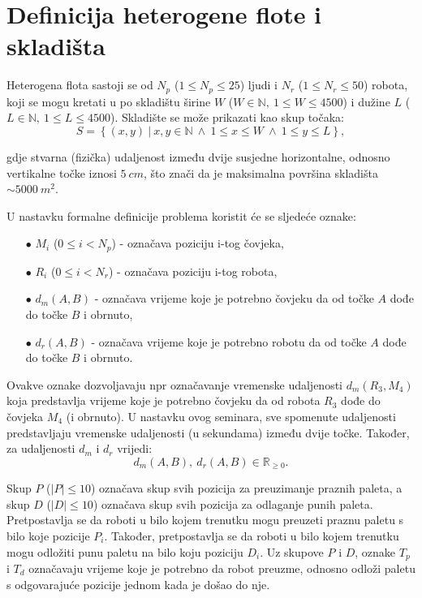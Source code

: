 \documentclass[times, utf8, seminar]{fer}
\begin{document}
\section{Definicija heterogene flote i skladišta}

Heterogena flota sastoji se od $N_p$ ($1 \le N_p \le 25$) ljudi i
 $N_r$ ($1 \le N_r \le 50$) robota,
koji se mogu kretati u po skladištu širine $W$ ($W \in \mathbb{N},\ 1 \le W \le 4500$)
i  dužine $L$ ($L \in \mathbb{N},\ 1 \le L \le 4500$).
Skladište se može prikazati kao skup točaka:
\begin{equation}
S = \left\{(x, y)\ |\ x, y \in \mathbb{N}\ \land\ 1 \le x \le W\ \land\ 1 \le y \le L\right\},
\end{equation}

gdje stvarna (fizička) udaljenost između dvije susjedne horizontalne, odnosno vertikalne točke
iznosi $5\ cm$, što znači da je maksimalna površina skladišta
$\sim5000\ m^2$.

U nastavku formalne definicije problema koristit će se sljedeće oznake:
\begin{itemize}
    \item[$\bullet$] $M_i$ ($0 \le i < N_p$) - označava poziciju i-tog čovjeka,
    \item[$\bullet$] $R_i$ ($0 \le i < N_r$) - označava poziciju i-tog robota,
    \item[$\bullet$] $d_m(A, B)$ - označava vrijeme koje je potrebno čovjeku da od točke $A$ dođe do točke $B$ i obrnuto,
    \item[$\bullet$] $d_r(A, B)$ - označava vrijeme koje je potrebno robotu da od točke $A$ dođe do točke $B$ i obrnuto.
\end{itemize}

Ovakve oznake dozvoljavaju npr označavanje vremenske udaljenosti $d_m(R_3, M_4)$ koja
predstavlja vrijeme koje je potrebno čovjeku da od robota $R_3$ dođe do čovjeka
$M_4$ (i obrnuto).
U nastavku ovog seminara, sve spomenute udaljenosti predstavljaju vremenske udaljenosti (u sekundama) između
dvije točke. Također, za udaljenosti $d_m$ i $d_r$ vrijedi:
\begin{equation}
d_m(A, B),\ d_r(A, B) \in \mathbb{R}_{\ge0}.
\end{equation}

Skup $P$ ($|P| \le 10$) označava skup svih pozicija za preuzimanje praznih paleta,
a skup $D$ ($|D| \le 10$) označava skup svih pozicija za odlaganje punih paleta. Pretpostavlja
se da roboti u bilo kojem trenutku mogu preuzeti praznu paletu s bilo koje pozicije $P_i$.
Također, pretpostavlja se da roboti u bilo kojem trenutku mogu odložiti punu paletu na bilo
koju poziciju $D_i$. Uz skupove $P$ i $D$, oznake $T_p$ i $T_d$ označavaju
vrijeme koje je potrebno da robot preuzme, odnosno odloži paletu s
odgovarajuće pozicije jednom kada je došao do nje.
\end{document}
